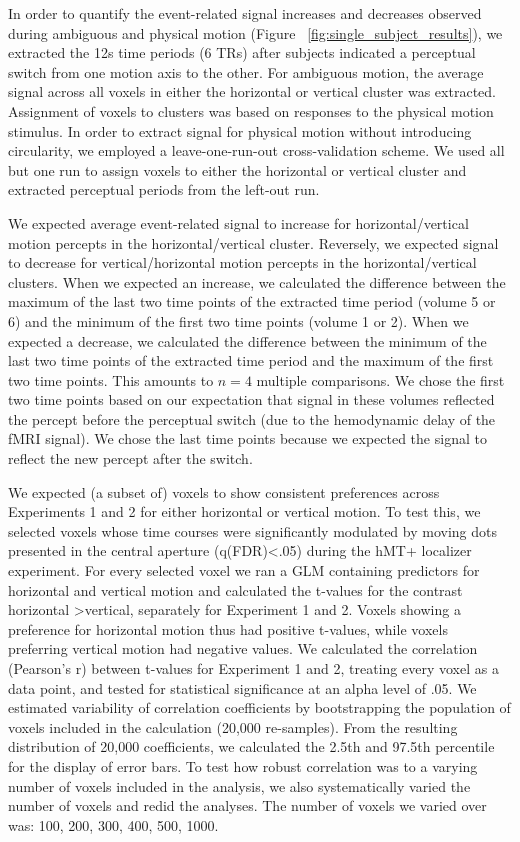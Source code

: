 In order to quantify the event-related signal increases and decreases observed during ambiguous and physical motion (Figure ~\ref{fig:single_subject_results}), we extracted the 12s time periods (6 TRs) after subjects indicated a perceptual switch from one motion axis to the other. For ambiguous motion, the average signal across all voxels in either the horizontal or vertical cluster was extracted. Assignment of voxels to clusters was based on responses to the physical motion stimulus. In order to extract signal for physical motion without introducing circularity, we employed a leave-one-run-out cross-validation scheme. We used all but one run to assign voxels to either the horizontal or vertical cluster and extracted perceptual periods from the left-out run.

We expected average event-related signal to increase for horizontal/vertical motion percepts in the horizontal/vertical cluster. Reversely, we expected signal to decrease for vertical/horizontal motion percepts in the horizontal/vertical clusters. When we expected an increase, we calculated the difference between the maximum of the last two time points of the extracted time period (volume 5 or 6) and the minimum of the first two time points (volume 1 or 2). When we expected a decrease, we calculated the difference between the minimum of the last two time points of the extracted time period and the maximum of the first two time points. This amounts to $n=4$ multiple comparisons. We chose the first two time points based on our expectation that signal in these volumes reflected the percept before the perceptual switch (due to the hemodynamic delay of the fMRI signal). We chose the last time points because we expected the signal to reflect the new percept after the switch.

We expected (a subset of) voxels to show consistent preferences across Experiments 1 and 2 for either horizontal or vertical motion. To test this, we selected voxels whose time courses were significantly modulated by moving dots presented in the central aperture (q(FDR)\textless.05) during the hMT+ localizer experiment. For every selected voxel we ran a GLM containing predictors for horizontal and vertical motion and calculated the t-values for the contrast horizontal \textgreater vertical, separately for Experiment 1 and 2. Voxels showing a preference for horizontal motion thus had positive t-values, while voxels preferring vertical motion had negative values. We calculated the correlation (Pearson's r) between t-values for Experiment 1 and 2, treating every voxel as a data point, and tested for statistical significance at an alpha level of .05. We estimated variability of correlation coefficients by bootstrapping the population of voxels included in the calculation (20,000 re-samples). From the resulting distribution of 20,000 coefficients, we calculated the 2.5th and 97.5th percentile for the display of error bars. To test how robust correlation was to a varying number of voxels included in the analysis, we also systematically varied the number of voxels and redid the analyses. The number of voxels we varied over was: 100, 200, 300, 400, 500, 1000.

